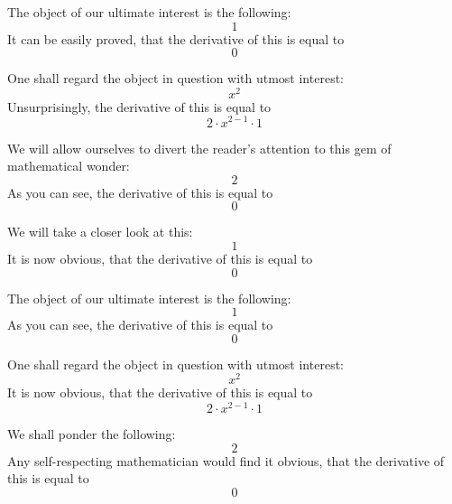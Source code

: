 \documentclass{article}
\begin{document}
The object of our ultimate interest is the following:
\begin{equation}
1 
\end{equation}
It can be easily proved, that the derivative of this is equal to
\begin{equation}
0 
\end{equation}

One shall regard the object in question with utmost interest:
\begin{equation}
x ^{2 } 
\end{equation}
Unsurprisingly, the derivative of this is equal to
\begin{equation}
2 \cdot x ^{2 - 1 } \cdot 1 
\end{equation}

We will allow ourselves to divert the reader's attention to this gem of mathematical wonder:
\begin{equation}
2 
\end{equation}
As you can see, the derivative of this is equal to
\begin{equation}
0 
\end{equation}

We will take a closer look at this:
\begin{equation}
1 
\end{equation}
It is now obvious, that the derivative of this is equal to
\begin{equation}
0 
\end{equation}

The object of our ultimate interest is the following:
\begin{equation}
1 
\end{equation}
As you can see, the derivative of this is equal to
\begin{equation}
0 
\end{equation}

One shall regard the object in question with utmost interest:
\begin{equation}
x ^{2 } 
\end{equation}
It is now obvious, that the derivative of this is equal to
\begin{equation}
2 \cdot x ^{2 - 1 } \cdot 1 
\end{equation}

We shall ponder the following:
\begin{equation}
2 
\end{equation}
Any self-respecting mathematician would find it obvious, that the derivative of this is equal to
\begin{equation}
0 
\end{equation}
\end{document}
